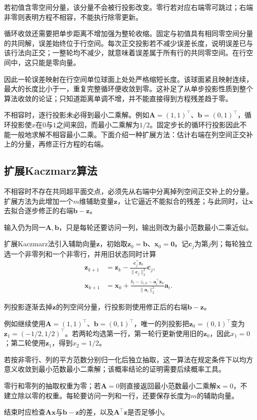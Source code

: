 若初值含零空间分量，该分量不会被行投影改变。零行若对应右端零可跳过；右端非零则表明方程不相容，不能执行除零更新。

循环收敛还需要把单步距离不增加强为整轮收缩。固定与初值具有相同零空间分量的共同解，误差始终位于行空间。每次正交投影若不减少误差长度，说明误差已与该行法向正交；一整轮均不减少，就意味着误差属于所有行的共同零空间。在行空间中，这只能是零向量。

因此一轮误差映射在行空间单位球面上处处严格缩短长度。该球面紧且映射连续，最大的长度比小于一，重复完整循环便收敛到零。这补足了从单步投影性质到整个算法收敛的论证；只知道距离单调不增，并不能直接得到方程残差趋于零。

不相容时，逐行投影未必得到最小二乘解。例如$\bm A=(1,1)^\top$、$\bm b=(0,1)^\top$，循环投影使$x$在$0$与$1$之间来回，而最小二乘解为$1/2$。固定步长的循环行投影因此不能一般地求解不相容最小二乘。下面介绍一种扩展方法：估计右端在列空间正交补上的分量，再修正行方程的右端。

\subsection{扩展Kaczmarz算法}

不相容时不存在共同超平面交点，必须先从右端中分离掉列空间正交补上的分量。扩展方法为此增加一个$m$维辅助变量$\bm z$，让它逼近不能拟合的残差；与此同时，让$\bm x$去拟合逐步修正的右端$\bm b-\bm z$。

输入仍为同一$\bm A,\bm b$，只是每轮还要访问一列，输出则改为最小范数最小二乘近似。

扩展Kaczmarz法引入辅助向量$\bm z$，初始取$\bm z_{0}=\bm b$、$\bm x_{0}=\bm0$。记$\bm c_j$为第$j$列；每轮独立选一个非零列和一个非零行，并用旧状态同时计算
\begin{align*}
 \bm z_{k+1}&=\bm z_{k}-
 \frac{\bm c_j^\top\bm z_{k}}{\lVert\bm c_j\rVert_2^2}\bm c_j,\\
 \bm x_{k+1}&=\bm x_{k}+
 \frac{b_i-z_{i,k}-\bm a_i^\top\bm x_{k}}{\lVert\bm a_i\rVert_2^2}\bm a_i.
\end{align*}

列投影逐渐去掉$\bm z$的列空间分量，行投影则使用修正后的右端$\bm b-\bm z$。

例如继续使用$\bm A=(1,1)^\top$、$\bm b=(0,1)^\top$，唯一的列投影把$\bm z_{0}=(0,1)^\top$变为$\bm z_{1}=(-1/2,1/2)^\top$。若两轮均选第一行，第一轮行更新使用旧的$\bm z_{0}$，因此$x_1=0$；第二轮使用$\bm z_{1}$，得到$x_2=1/2$。

若按非零行、列的平方范数分别归一化后独立抽取，这一算法在规定条件下以均方意义收敛到最小范数最小二乘解；该概率结论的证明需要后续概率工具。

零行和零列的抽取权重为零；若$\bm A=0$则直接返回最小范数最小二乘解$\bm x=0$，不建立除以零的权重。每轮要访问一列和一行，还要保存长度为$m$的辅助向量。

结束时应检查$\bm A\bm x$与$\bm b-\bm z$的差，以及$\bm A^\top\bm z$是否足够小。
